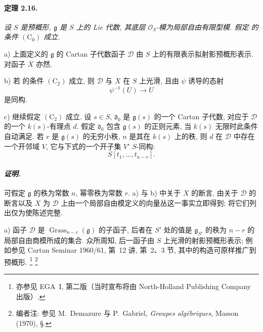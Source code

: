 \paragraph{\textbf{定理 2.16.}}
{\itshape 设 \(S\) 是预概形, \(\mathfrak g\) 是 \(S\) 上的 Lie 代数, 其底层 \(\mathcal O_S\)-模为局部自由有限型模. 假定  的条件 \((\mathrm C_0)\) 成立.

\smallskip
\noindent
\textup{a)}
上面定义的 \(\mathfrak g\) 的 Cartan 子代数函子 \(\mathcal D\) 由 \(S\) 上的有限表示拟射影预概形表示. 对函子 \(X\) 亦然.

\smallskip
\noindent
\textup{b)}
若  的条件 \((\mathrm C_2)\) 成立, 则 \(\mathcal D\) 与 \(X\) 在 \(S\) 上光滑, 且由 \(\psi\) 诱导的态射
\[
  \psi^{-1}(U)\longrightarrow U
\]
是同构.

\smallskip
\noindent
\textup{c)}
继续假定 \((\mathrm C_2)\) 成立. 设 \(s\in S\), \(\mathfrak d_0\) 是 \(\mathfrak g(s)\) 的一个 Cartan 子代数, 对应于 \(\mathcal D\) 的一个 \(k(s)\)-有理点 \(d\). 假定 \(\mathfrak d_0\) 包含 \(\mathfrak g(s)\) 的正则元素, 当 \(k(s)\) 无限时此条件自动满足. 若 \(r\) 是 \(\mathfrak g(s)\) 的无穷小秩, \(n\) 是其在 \(k(s)\) 上的秩, 则 \(d\) 在 \(\mathcal D\) 中存在一个开邻域 \(V\), 它与下式的一个开子集 \(V'\) \(S\)-同构:
\[
  S[t_1,\ldots,t_{n-r}].
\]}



\paragraph{\textit{证明.}}
可假定 \(\mathfrak g\) 的秩为常数 \(n\), 幂零秩为常数 \(r\). \textup{a)} 与 \textup{b)} 中关于 \(X\) 的断言, 由关于 \(\mathcal D\) 的断言以及 \(X\) 为 \(\mathcal D\) 上由一个局部自由模定义的向量丛这一事实立即得到; 将它们列出仅为使陈述完整.

\medskip
\noindent\textup{a)}
函子 \(\mathcal D\) 是 \(\operatorname{Grass}_{n-r}(\mathfrak g)\) 的子函子, 后者在 \(S'\) 处的值是 \(\mathfrak g_{S'}\) 的秩为 \(n-r\) 的局部自由商模所成的集合. 众所周知, 后一函子由 \(S\) 上光滑的射影预概形表示; 例如参见 Cartan Seminar 1960/61, 第~12 讲, 第~2、3 节, 其中的构造可原样推广到预概形.\begingroup
\renewcommand{\thefootnote}{*}\footnote{亦参见 EGA~I, 第二版\textup{（当时宣布将由 North-Holland Publishing Company 出版）}.}
\endgroup\footnote{编者注: 参见 M.~Demazure 与 P.~Gabriel, \emph{Groupes algébriques}, Masson \textup{(1970)}, \S {}.}

